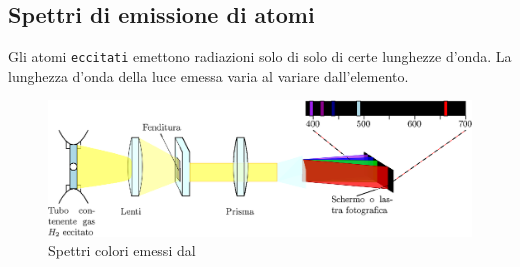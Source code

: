\subsection{Spettri di emissione di atomi}
\label{sec:spemdiatom}

\begin{defi}
  Gli atomi \texttt{eccitati} emettono radiazioni solo di solo di certe lunghezze d'onda. La lunghezza d'onda
  della luce emessa varia al variare dall'elemento.
  \begin{figure}[ht!]
    \centering
    \includegraphics[width=14cm]{img/spettriColatom.eps}
    \caption{Spettri colori emessi dal }
    \label{fig:h2spttricolor}
  \end{figure}
\end{defi}


